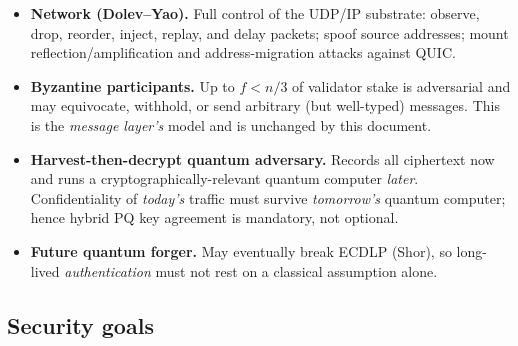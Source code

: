 \documentclass[11pt,a4paper]{article}
\begin{document}
\begin{itemize}[nosep]
  \item \textbf{Network (Dolev--Yao).} Full control of the UDP/IP
        substrate: observe, drop, reorder, inject, replay, and delay
        packets; spoof source addresses; mount reflection/amplification
        and address-migration attacks against QUIC.
  \item \textbf{Byzantine participants.} Up to $f<n/3$ of validator
        stake is adversarial and may equivocate, withhold, or send
        arbitrary (but well-typed) messages. This is the \emph{message
        layer's} model and is unchanged by this document.
  \item \textbf{Harvest-then-decrypt quantum adversary.} Records all
        ciphertext now and runs a cryptographically-relevant quantum
        computer \emph{later}. Confidentiality of \emph{today's} traffic
        must survive \emph{tomorrow's} quantum computer; hence hybrid PQ
        key agreement is mandatory, not optional.
  \item \textbf{Future quantum forger.} May eventually break ECDLP
        (Shor), so long-lived \emph{authentication} must not rest on a
        classical assumption alone.
\end{itemize}

\subsection{Security goals}
\end{document}
